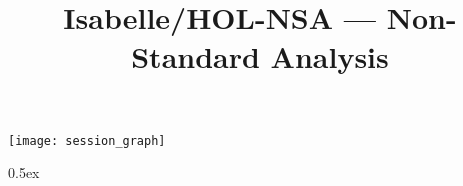 \documentclass[11pt,a4paper]{article}
\begin{document}
\title{Isabelle/HOL-NSA --- Non-Standard Analysis}
\maketitle

\tableofcontents

\begin{center}
  \texttt{[image: session\_graph]}
\end{center}

\newpage

\renewcommand{\isamarkupheader}[1]%
{\section{\isabellecontext: #1}\markright{THEORY~``\isabellecontext''}}

\parindent 0pt\parskip 0.5ex

\end{document}
